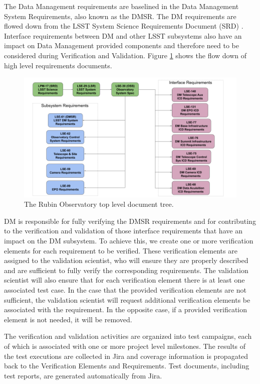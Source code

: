 The Data Management requirements are baselined in the Data Management System Requirements\cite{LSE-61}, also known as the DMSR.
The DM requirements are flowed down from the LSST System Science Requirements Document (SRD) \cite{LPM-17}. Interface requirements between DM and other LSST subsystems also have an impact on Data Management provided components and therefore need to be considered during Verification and Validation.
Figure \ref{fig:topdoctree} shows the flow down of high level requirements documents.

\begin{figure}
\begin{center}
\includegraphics[width=\textwidth]{imgs/TopLevelDocTree.png}
 \caption{The Rubin Observatory top level document tree.}
 \label{fig:topdoctree}
\end{center}
\end{figure}

DM is responsible for fully verifying the DMSR requirements and for contributing to the verification and validation of those interface requirements that have an impact on the DM subsystem.
To achieve this, we create one or more verification elements for each requirement to be verified.
These verification elements are assigned to the validation scientist,
who will ensure they are properly described and are sufficient to fully verify the corresponding requirements.
The validation scientist will also ensure that for each verification element there is at least one associated test case.
In the case that the provided verification elements are not sufficient, the validation scientist will request additional verification elements be associated with the requirement.
In the opposite case, if a provided verification element is not needed, it will be removed.

The verification and validation activities are organized into test campaigns, each of which is associated with one or more project level milestones.
The results of the test executions are collected in Jira and coverage information is propagated back to the Verification Elements and Requirements.
Test documents, including test reports, are generated automatically from Jira.

